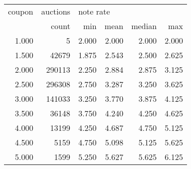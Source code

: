 \begin{tabular}{rrrrrr}
\toprule
coupon & auctions & \multicolumn{4}{l}{note rate} \\
       &    count &       min &  mean & median &   max \\
\midrule
 1.000 &        5 &     2.000 & 2.000 &  2.000 & 2.000 \\
 1.500 &    42679 &     1.875 & 2.543 &  2.500 & 2.625 \\
 2.000 &   290113 &     2.250 & 2.884 &  2.875 & 3.125 \\
 2.500 &   296308 &     2.750 & 3.287 &  3.250 & 3.625 \\
 3.000 &   141033 &     3.250 & 3.770 &  3.875 & 4.125 \\
 3.500 &    36148 &     3.750 & 4.240 &  4.250 & 4.625 \\
 4.000 &    13199 &     4.250 & 4.687 &  4.750 & 5.125 \\
 4.500 &     5159 &     4.750 & 5.098 &  5.125 & 5.625 \\
 5.000 &     1599 &     5.250 & 5.627 &  5.625 & 6.125 \\
\bottomrule
\end{tabular}
